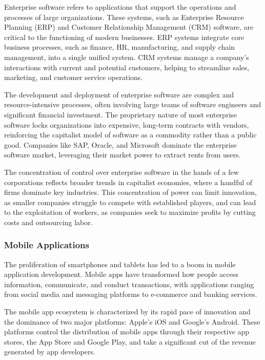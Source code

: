 \begin{refsection}
\begin{multicols}{2}
{Enterprise software refers to applications that support the operations and processes of large organizations. These systems, such as Enterprise Resource Planning (ERP) and Customer Relationship Management (CRM) software, are critical to the functioning of modern businesses. ERP systems integrate core business processes, such as finance, HR, manufacturing, and supply chain management, into a single unified system. CRM systems manage a company's interactions with current and potential customers, helping to streamline sales, marketing, and customer service operations.

The development and deployment of enterprise software are complex and resource-intensive processes, often involving large teams of software engineers and significant financial investment. The proprietary nature of most enterprise software locks organizations into expensive, long-term contracts with vendors, reinforcing the capitalist model of software as a commodity rather than a public good. Companies like SAP, Oracle, and Microsoft dominate the enterprise software market, leveraging their market power to extract rents from users.

The concentration of control over enterprise software in the hands of a few corporations reflects broader trends in capitalist economies, where a handful of firms dominate key industries. This concentration of power can limit innovation, as smaller companies struggle to compete with established players, and can lead to the exploitation of workers, as companies seek to maximize profits by cutting costs and outsourcing labor.

\subsubsection{Mobile Applications}

The proliferation of smartphones and tablets has led to a boom in mobile application development. Mobile apps have transformed how people access information, communicate, and conduct transactions, with applications ranging from social media and messaging platforms to e-commerce and banking services.

The mobile app ecosystem is characterized by its rapid pace of innovation and the dominance of two major platforms: Apple's iOS and Google's Android. These platforms control the distribution of mobile apps through their respective app stores, the App Store and Google Play, and take a significant cut of the revenue generated by app developers.

}
\end{multicols}
\end{refsection}
